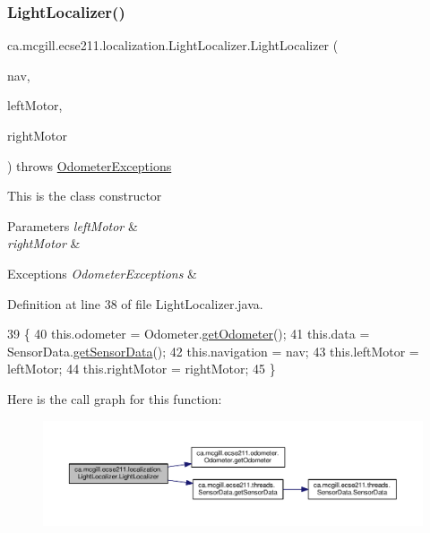 \subsubsection{\texorpdfstring{Light\+Localizer()}{LightLocalizer()}}
{\footnotesize\ttfamily ca.\+mcgill.\+ecse211.\+localization.\+Light\+Localizer.\+Light\+Localizer (\begin{DoxyParamCaption}\item[{\hyperlink{classca_1_1mcgill_1_1ecse211_1_1project_1_1_navigation}{Navigation}}]{nav,  }\item[{E\+V3\+Large\+Regulated\+Motor}]{left\+Motor,  }\item[{E\+V3\+Large\+Regulated\+Motor}]{right\+Motor }\end{DoxyParamCaption}) throws \hyperlink{classca_1_1mcgill_1_1ecse211_1_1odometer_1_1_odometer_exceptions}{Odometer\+Exceptions}}

This is the class constructor


\begin{DoxyParams}{Parameters}
{\em left\+Motor} & \\
\hline
{\em right\+Motor} & \\
\hline
\end{DoxyParams}

\begin{DoxyExceptions}{Exceptions}
{\em Odometer\+Exceptions} & \\
\hline
\end{DoxyExceptions}


Definition at line 38 of file Light\+Localizer.\+java.


\begin{DoxyCode}
39                                                                    \{
40     this.odometer = Odometer.\hyperlink{classca_1_1mcgill_1_1ecse211_1_1odometer_1_1_odometer_a99171f11e34dea918fa9dd069d721439}{getOdometer}();
41     this.data = SensorData.\hyperlink{classca_1_1mcgill_1_1ecse211_1_1threads_1_1_sensor_data_a8260aba53b4474ca1275e4ce26157977}{getSensorData}();
42     this.navigation = nav;
43     this.leftMotor = leftMotor;
44     this.rightMotor = rightMotor;
45   \}
\end{DoxyCode}
Here is the call graph for this function\+:\nopagebreak
\begin{figure}[H]
\begin{center}
\leavevmode
\includegraphics[width=350pt]{classca_1_1mcgill_1_1ecse211_1_1localization_1_1_light_localizer_aa37a75b7c32c02fe261845021f0734b7_cgraph}
\end{center}
\end{figure}


